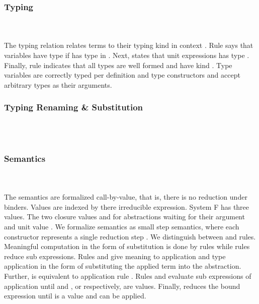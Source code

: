 \subsubsection{Typing}\hfill\\\\
The typing relation    \Data{:}  relates terms  to their typing kind  in context .
\FTyping
Rule  says that variables   have type  if  has type  in . Next,  states that unit expressions  has type . 
Finally, rule  indicates that all types  are well formed and have kind . Type variables are correctly typed per definition and type constructors  and  accept arbitrary types as their arguments.

\subsubsection{Typing Renaming \& Substitution}\hfill\\\\
\FRenTyping
\FSubTyping

\subsubsection{Semantics}\hfill\\\\
The semantics are formalized call-by-value, that is, there is no reduction under binders. Values are indexed by there irreducible expression.
\FVal
System F has three values. The two closure values  and  for abstractions waiting for their argument and unit value .
We formalize semantics as small step semantics, where each constructor represents a single reduction step   .
We distinguish between  and  rules. Meaningful computation in the form of substitution is done by  rules while  rules reduce sub expressions.
\FSemantics
Rules  and  give meaning to application and type application in the form of substituting the applied term into the abstraction. Further,  is equivalent to application rule . Rules  and  evaluate sub expressions of application until  and , or  respectively, are values. Finally,  reduces the bound expression  until  is a value and  can be applied.    
